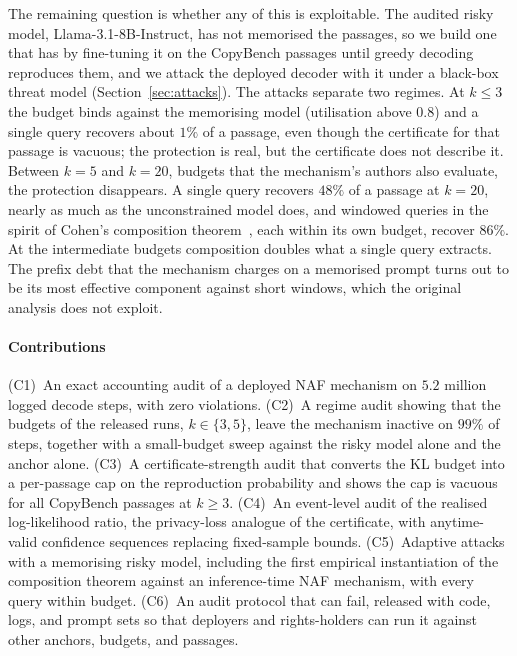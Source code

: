 The remaining question is whether any of this is exploitable. The audited risky model, Llama-3.1-8B-Instruct, has not memorised the passages, so we build one that has by fine-tuning it on the CopyBench passages until greedy decoding reproduces them, and we attack the deployed decoder with it under a black-box threat model (Section~\ref{sec:attacks}). The attacks separate two regimes. At $k \le 3$ the budget binds against the memorising model (utilisation above $0.8$) and a single query recovers about $1\%$ of a passage, even though the certificate for that passage is vacuous; the protection is real, but the certificate does not describe it. Between $k=5$ and $k=20$, budgets that the mechanism's authors also evaluate, the protection disappears. A single query recovers $48\%$ of a passage at $k=20$, nearly as much as the unconstrained model does, and windowed queries in the spirit of Cohen's composition theorem~\cite{cohen2025blameless}, each within its own budget, recover $86\%$. At the intermediate budgets composition doubles what a single query extracts. The prefix debt that the mechanism charges on a memorised prompt turns out to be its most effective component against short windows, which the original analysis does not exploit.

\paragraph{Contributions}
(C1)~An exact accounting audit of a deployed NAF mechanism on $5.2$ million logged decode steps, with zero violations. (C2)~A regime audit showing that the budgets of the released runs, $k \in \{3, 5\}$, leave the mechanism inactive on $99\%$ of steps, together with a small-budget sweep against the risky model alone and the anchor alone. (C3)~A certificate-strength audit that converts the KL budget into a per-passage cap on the reproduction probability and shows the cap is vacuous for all CopyBench passages at $k \ge 3$. (C4)~An event-level audit of the realised log-likelihood ratio, the privacy-loss analogue of the certificate, with anytime-valid confidence sequences replacing fixed-sample bounds. (C5)~Adaptive attacks with a memorising risky model, including the first empirical instantiation of the composition theorem against an inference-time NAF mechanism, with every query within budget. (C6)~An audit protocol that can fail, released with code, logs, and prompt sets so that deployers and rights-holders can run it against other anchors, budgets, and passages.
